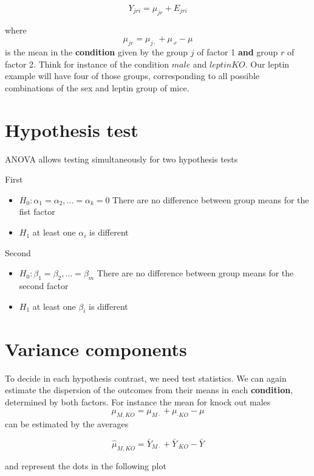 \documentclass[
]{book}
\begin{document}
\[Y_{jri} = \mu_{jr} + E_{jri}\]

where \[\mu_{jr} = \mu_{j \cdot} + \mu_{\cdot r} - \mu\] is the mean in the \textbf{condition} given by the group \(j\) of factor 1 \textbf{and} group \(r\) of factor 2. Think for instance of the condition \(male\) and \(leptinKO\). Our leptin example will have four of those groups, corresponding to all possible combinations of the sex and leptin group of mice.

\hypertarget{hypothesis-test-3}{%
\section{Hypothesis test}\label{hypothesis-test-3}}

ANOVA allows testing simultaneously for two hypothesis tests

First

\begin{itemize}
\item
  \(H_0: \alpha_1=\alpha_2, ...=\alpha_k=0\) There are no difference between group means for the fist factor
\item
  \(H_1\) at least one \(\alpha_i\) is different
\end{itemize}

Second

\begin{itemize}
\item
  \(H_0: \beta_1=\beta_2, ...=\beta_m\) There are no difference between group means for the second factor
\item
  \(H_1\) at least one \(\beta_i\) is different
\end{itemize}

\hypertarget{variance-components}{%
\section{Variance components}\label{variance-components}}

To decide in each hypothesis contrast, we need test statistics. We can again estimate the dispersion of the outcomes from their means in each \textbf{condition}, determined by both factors. For instance the mean for knock out males \[\mu_{M,KO}=\mu_{M \cdot} + \mu_{\cdot KO} - \mu\] can be estimated by the averages

\[\hat{\mu}_{M,KO}= \bar{Y}_{M \cdot}+\bar{Y}_{\cdot KO} - \bar{Y}\]

and represent the dots in the following plot
\end{document}
